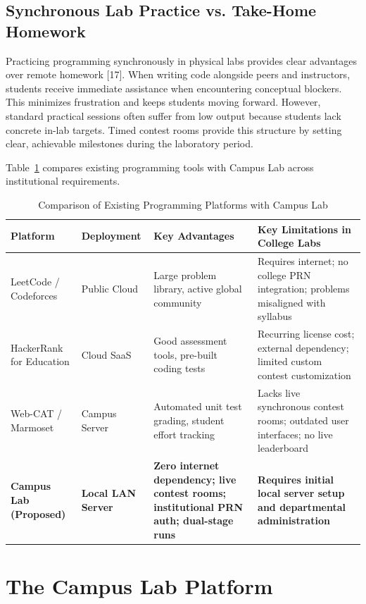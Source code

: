 \documentclass[12pt,a4paper]{article}
\begin{document}
\subsection{Synchronous Lab Practice vs. Take-Home Homework}
Practicing programming synchronously in physical labs provides clear advantages over remote homework [17]. When writing code alongside peers and instructors, students receive immediate assistance when encountering conceptual blockers. This minimizes frustration and keeps students moving forward. However, standard practical sessions often suffer from low output because students lack concrete in-lab targets. Timed contest rooms provide this structure by setting clear, achievable milestones during the laboratory period.

Table~\ref{tab:comparison} compares existing programming tools with Campus Lab across institutional requirements.

\begin{table}[!htbp]
\centering
\small
\caption{Comparison of Existing Programming Platforms with Campus Lab}
\label{tab:comparison}
\begin{tabularx}{\linewidth}{|l|l|X|X|}
\hline
\textbf{Platform} & \textbf{Deployment} & \textbf{Key Advantages} & \textbf{Key Limitations in College Labs} \\
\hline
LeetCode / Codeforces & Public Cloud & Large problem library, active global community & Requires internet; no college PRN integration; problems misaligned with syllabus \\
\hline
HackerRank for Education & Cloud SaaS & Good assessment tools, pre-built coding tests & Recurring license cost; external dependency; limited custom contest customization \\
\hline
Web-CAT / Marmoset & Campus Server & Automated unit test grading, student effort tracking & Lacks live synchronous contest rooms; outdated user interfaces; no live leaderboard \\
\hline
\textbf{Campus Lab (Proposed)} & \textbf{Local LAN Server} & \textbf{Zero internet dependency; live contest rooms; institutional PRN auth; dual-stage runs} & \textbf{Requires initial local server setup and departmental administration} \\
\hline
\end{tabularx}
\end{table}

\section{The Campus Lab Platform}
\label{sec:platform}
\end{document}
